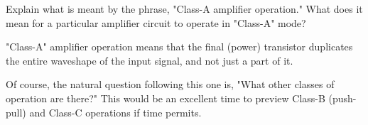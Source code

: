 

Explain what is meant by the phrase, "Class-A amplifier operation."  What does it mean for a particular amplifier circuit to operate in "Class-A" mode?







"Class-A" amplifier operation means that the final (power) transistor duplicates the entire waveshape of the input signal, and not just a part of it.







Of course, the natural question following this one is, "What other classes of operation are there?"  This would be an excellent time to preview Class-B (push-pull) and Class-C operations if time permits.




